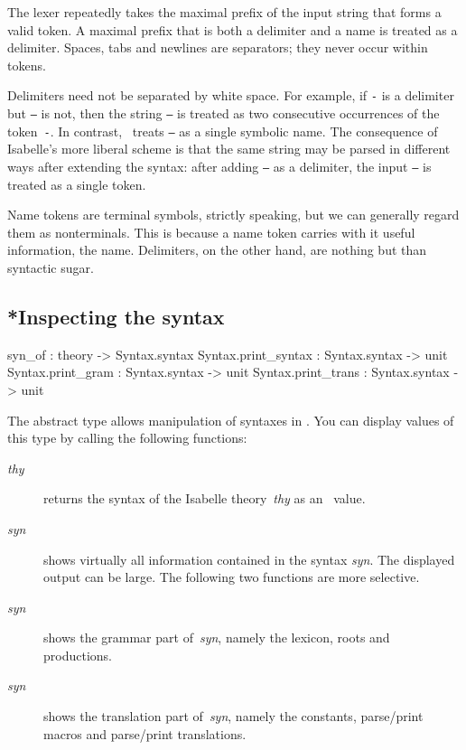 The lexer repeatedly takes the maximal prefix of the input string that
forms a valid token.  A maximal prefix that is both a delimiter and a name
is treated as a delimiter.  Spaces, tabs and newlines are separators; they
never occur within tokens.

Delimiters need not be separated by white space.  For example, if {\tt -}
is a delimiter but {\tt --} is not, then the string {\tt --} is treated as
two consecutive occurrences of the token~{\tt -}.  In contrast, \ML\ 
treats {\tt --} as a single symbolic name.  The consequence of Isabelle's
more liberal scheme is that the same string may be parsed in different ways
after extending the syntax: after adding {\tt --} as a delimiter, the input
{\tt --} is treated as a single token.

Name tokens are terminal symbols, strictly speaking, but we can generally
regard them as nonterminals.  This is because a name token carries with it
useful information, the name.  Delimiters, on the other hand, are nothing
but than syntactic sugar.


\subsection{*Inspecting the syntax}
\begin{ttbox}
syn_of              : theory -> Syntax.syntax
Syntax.print_syntax : Syntax.syntax -> unit
Syntax.print_gram   : Syntax.syntax -> unit
Syntax.print_trans  : Syntax.syntax -> unit
\end{ttbox}
The abstract type  allows manipulation of syntaxes
in \ML.  You can display values of this type by calling the following
functions:
\begin{description}
\item[ {\it thy}] returns the syntax of the Isabelle
  theory~{\it thy} as an \ML\ value.

\item[ {\it syn}] shows virtually all
  information contained in the syntax {\it syn}.  The displayed output can
  be large.  The following two functions are more selective.

\item[ {\it syn}] shows the grammar part
  of~{\it syn}, namely the lexicon, roots and productions.

\item[ {\it syn}] shows the translation
  part of~{\it syn}, namely the constants, parse/print macros and
  parse/print translations.
\end{description}

